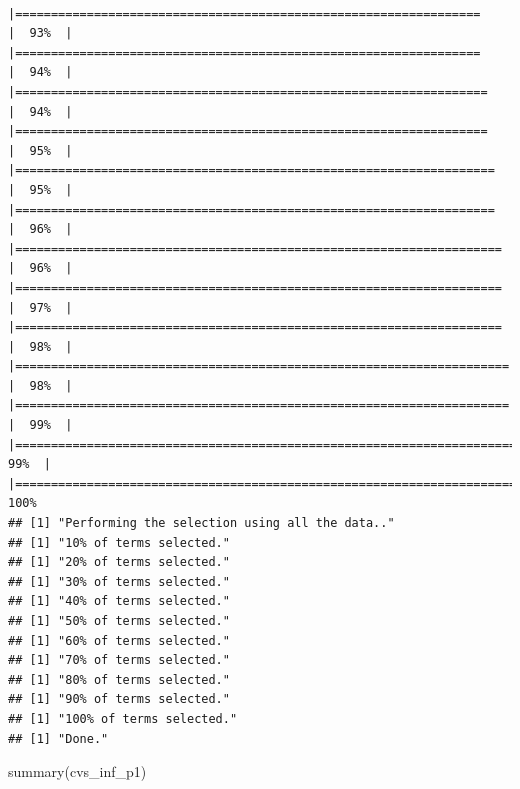 \documentclass[
]{article}
\newenvironment{Shaded}{\begin{snugshade}}{\end{snugshade}}
\newcommand{\FunctionTok}[1]{\textcolor[rgb]{0.00,0.00,0.00}{#1}}
\newcommand{\NormalTok}[1]{#1}
\begin{document}
\begin{verbatim}
          |=================================================================     |  93%  |                                                                              |=================================================================     |  94%  |                                                                              |==================================================================    |  94%  |                                                                              |==================================================================    |  95%  |                                                                              |===================================================================   |  95%  |                                                                              |===================================================================   |  96%  |                                                                              |====================================================================  |  96%  |                                                                              |====================================================================  |  97%  |                                                                              |====================================================================  |  98%  |                                                                              |===================================================================== |  98%  |                                                                              |===================================================================== |  99%  |                                                                              |======================================================================|  99%  |                                                                              |======================================================================| 100%
## [1] "Performing the selection using all the data.."
## [1] "10% of terms selected."
## [1] "20% of terms selected."
## [1] "30% of terms selected."
## [1] "40% of terms selected."
## [1] "50% of terms selected."
## [1] "60% of terms selected."
## [1] "70% of terms selected."
## [1] "80% of terms selected."
## [1] "90% of terms selected."
## [1] "100% of terms selected."
## [1] "Done."
\end{verbatim}

\begin{Shaded}
\begin{Highlighting}[]
\FunctionTok{summary}\NormalTok{(cvs\_inf\_p1)}
\end{Highlighting}
\end{Shaded}
\end{document}
